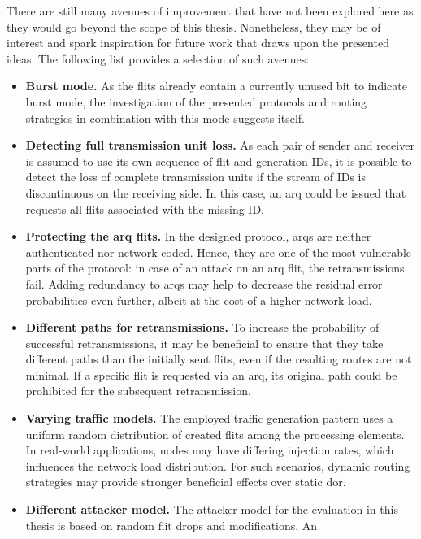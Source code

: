 There are still many avenues of improvement that have not been explored here as they would go beyond the scope of this thesis. Nonetheless, they may
be of interest and spark inspiration for future work that draws upon the presented ideas. The following list provides a selection of such avenues:
\begin{itemize}
    \item \textbf{Burst mode.} As the flits already contain a currently unused bit to indicate burst mode, the investigation of the presented
        protocols and routing strategies in combination with this mode suggests itself.
    \item \textbf{Detecting full transmission unit loss.} As each pair of sender and receiver is assumed to use its own sequence of flit and
        generation IDs, it is possible to detect the loss of complete transmission units if the stream of IDs is discontinuous on the receiving side.
        In this case, an \gls{arq} could be issued that requests all flits associated with the missing ID.
    \item \textbf{Protecting the \gls{arq} flits.} In the designed protocol, \glspl{arq} are neither authenticated nor network coded. Hence, they are
        one of the most vulnerable parts of the protocol: in case of an attack on an \gls{arq} flit, the retransmissions fail. Adding redundancy to
        \glspl{arq} may help to decrease the residual error probabilities even further, albeit at the cost of a higher network load.
    \item \textbf{Different paths for retransmissions.} To increase the probability of successful retransmissions, it may be beneficial to ensure that
        they take different paths than the initially sent flits, even if the resulting routes are not minimal. If a specific flit is requested via an
        \gls{arq}, its original path could be prohibited for the subsequent retransmission.
    \item \textbf{Varying traffic models.} The employed traffic generation pattern uses a uniform random distribution of created flits
        among the processing elements. In real-world applications, nodes may have differing injection rates, which influences the network load
        distribution. For such scenarios, dynamic routing strategies may provide stronger beneficial effects over static \gls{dor}.
    \item \textbf{Different attacker model.} The attacker model for the evaluation in this thesis is based on random flit drops and modifications. An

\end{itemize}
